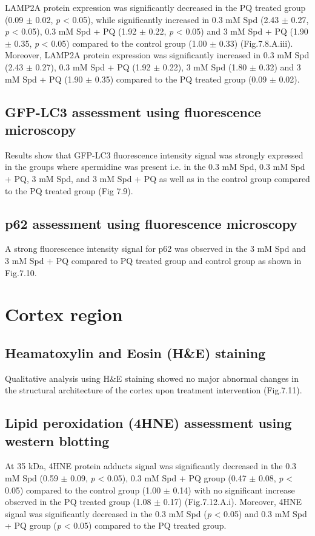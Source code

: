 LAMP2A protein expression was significantly decreased in the PQ treated group (0.09 $\pm$ 0.02, \textit{p} < 0.05), while significantly increased in 0.3 mM Spd (2.43 $\pm$ 0.27, \textit{p} < 0.05), 0.3 mM Spd + PQ (1.92 $\pm$ 0.22, \textit{p} < 0.05) and 3 mM Spd + PQ (1.90 $\pm$ 0.35, \textit{p} < 0.05) compared to the control group (1.00 $\pm$ 0.33) (Fig.7.8.A.iii). Moreover, LAMP2A protein expression was significantly increased in 0.3 mM Spd (2.43 $\pm$ 0.27), 0.3 mM Spd + PQ (1.92 $\pm$ 0.22), 3 mM Spd (1.80 $\pm$ 0.32) and 3 mM Spd + PQ (1.90 $\pm$ 0.35) compared to the PQ treated group (0.09 $\pm$ 0.02).


\subsection{GFP-LC3 assessment using fluorescence microscopy}
Results show that GFP-LC3 fluorescence intensity signal was strongly expressed in the groups where spermidine was present i.e. in the 0.3 mM Spd, 0.3 mM Spd + PQ, 3 mM Spd, and 3 mM Spd + PQ as well as in the control group compared to the PQ treated group (Fig 7.9).


\subsection{p62 assessment using fluorescence microscopy}
A strong fluorescence intensity signal for p62 was observed in the 3 mM Spd and 3 mM Spd + PQ compared to PQ treated group and control group as shown in Fig.7.10.


\section{Cortex region}
\subsection{Heamatoxylin and Eosin (H\&E) staining}
Qualitative analysis using H\&E staining showed no major abnormal changes in the structural architecture of the cortex upon treatment intervention (Fig.7.11).


\subsection{Lipid peroxidation (4HNE) assessment using western blotting}
At 35 kDa, 4HNE protein adducts signal was significantly decreased in the 0.3 mM Spd (0.59 $\pm$ 0.09, \textit{p} < 0.05), 0.3 mM Spd + PQ group (0.47 $\pm$ 0.08, \textit{p} < 0.05) compared to the control group (1.00 $\pm$ 0.14) with no significant increase observed in the PQ treated group (1.08 $\pm$ 0.17) (Fig.7.12.A.i). Moreover, 4HNE signal was significantly decreased in the 0.3 mM Spd (\textit{p} < 0.05) and 0.3 mM Spd + PQ group (\textit{p} < 0.05) compared to the PQ treated group. 

